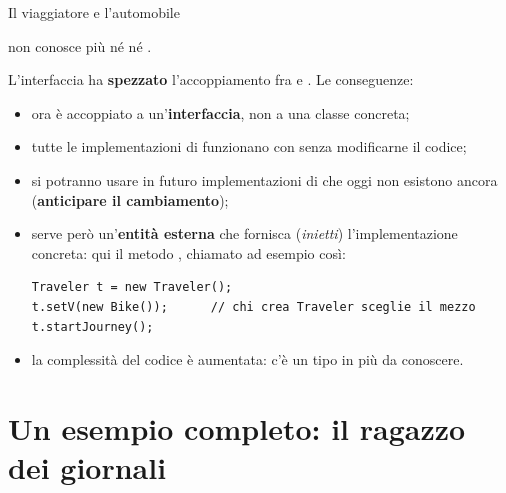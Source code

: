 \begin{esempio}{Il viaggiatore e l'automobile}
\begin{minipage}[c]{0.46\textwidth}
\vspace{4pt}
{\scriptsize {} non conosce più né  né .}
\end{minipage}

L'interfaccia  ha \textbf{spezzato} l'accoppiamento fra  e . Le conseguenze:
\begin{itemize}
  \item {} ora è accoppiato a un'\textbf{interfaccia}, non a una classe concreta;
  \item tutte le implementazioni di  funzionano con  senza modificarne il codice;
  \item si potranno usare in futuro implementazioni di  che oggi non esistono ancora (\textbf{anticipare il
        cambiamento});
  \item serve però un'\textbf{entità esterna} che fornisca (\textit{inietti}) l'implementazione concreta: qui il metodo
        , chiamato ad esempio così:
\begin{lstlisting}[style=java]
Traveler t = new Traveler();
t.setV(new Bike());      // chi crea Traveler sceglie il mezzo
t.startJourney();
\end{lstlisting}
  \item la complessità del codice è aumentata: c'è un tipo in più da conoscere.
\end{itemize}
\end{esempio}


\section{Un esempio completo: il ragazzo dei giornali}

